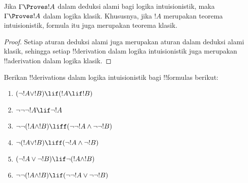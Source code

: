 \documentclass[../../../include/open-logic-section]{subfiles}
\begin{document}
\begin{prop}
  Jika $\Gamma \Proves !A$ dalam deduksi alami bagi logika intuisionistik,
  maka $\Gamma \Proves !A$ dalam logika klasik. Khususnya, jika $!A$
  merupakan teorema intuisionistik, formula itu juga merupakan teorema klasik.
\end{prop}

\begin{proof}
  Setiap aturan deduksi alami juga merupakan aturan dalam deduksi alami
  klasik, sehingga setiap !!{derivation} dalam logika intuisionistik juga
  merupakan !!a{derivation} dalam logika klasik.
\end{proof}

\begin{prob}
  Berikan !!{derivation}s dalam logika intuisionistik bagi !!{formula}s
  berikut:
  \begin{enumerate}
    \item $(\lnot !A \lor !B) \lif (!A \lif !B)$
    \item $\lnot\lnot\lnot !A \lif \lnot !A$
    \item $\lnot\lnot (!A \land !B) \liff (\lnot\lnot !A\land \lnot \lnot !B)$
    \item $\lnot (!A \lor !B) \liff (\lnot !A \land \lnot !B)$
    \item $(\lnot !A \lor \lnot !B) \lif \lnot (!A \land !B)$
    \item $\lnot\lnot ( !A \land !B) \lif  (\lnot\lnot !A \lor
    \lnot\lnot !B)$
  \end{enumerate}
\end{prob}
\end{document}

